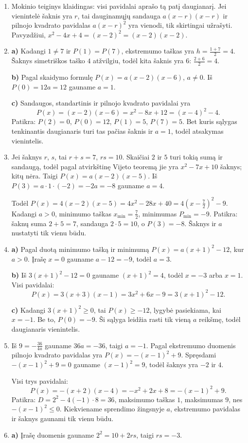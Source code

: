 \documentclass[12pt,a4paper]{article}
\begin{document}
\begin{enumerate}
\textbf{c)} Šaknis $2$ yra dviguboji. $R(x)=2(x-2)^2=2x^2-8x+8$. Minimumo taškas $2$, minimumas $0$; pilnojo kvadrato pavidalas sutampa su sandaugos pavidalu.
\item Mokinio teiginys klaidingas: visi pavidalai aprašo tą patį daugianarį. Jei vienintelė šaknis yra $r$, tai dauginamųjų sandauga $a(x-r)(x-r)$ ir pilnojo kvadrato pavidalas $a(x-r)^2$ yra vienodi, tik skirtingai užrašyti. Pavyzdžiui, $x^2-4x+4=(x-2)^2=(x-2)(x-2)$.
\item \textbf{a)} Kadangi $1\ne7$ ir $P(1)=P(7)$, ekstremumo taškas yra $h=\frac{1+7}{2}=4$. Šaknys simetriškos taško $4$ atžvilgiu, todėl kita šaknis yra $6$: $\frac{2+6}{2}=4$.

\textbf{b)} Pagal skaidymo formulę $P(x)=a(x-2)(x-6)$, $a\ne0$. Iš $P(0)=12a=12$ gauname $a=1$.

\textbf{c)} Sandaugos, standartinis ir pilnojo kvadrato pavidalai yra
\[P(x)=(x-2)(x-6)=x^2-8x+12=(x-4)^2-4.\]
Patikra: $P(2)=0$, $P(0)=12$, $P(1)=5$, $P(7)=5$. Bet kuris sąlygas tenkinantis daugianaris turi tas pačias šaknis ir $a=1$, todėl atsakymas vienintelis.
\item Jei šaknys $r$, $s$, tai $r+s=7$, $rs=10$. Skaičiai $2$ ir $5$ turi tokią sumą ir sandaugą, todėl pagal atvirkštinę Vijeto teoremą jie yra $x^2-7x+10$ šaknys; kitų nėra. Taigi $P(x)=a(x-2)(x-5)$. Iš $P(3)=a\cdot1\cdot(-2)=-2a=-8$ gauname $a=4$.

Todėl $P(x)=4(x-2)(x-5)=4x^2-28x+40=4\left(x-\frac{7}{2}\right)^2-9$. Kadangi $a>0$, minimumo taškas $x_{\min}=\frac{7}{2}$, minimumas $P_{\min}=-9$. Patikra: šaknų suma $2+5=7$, sandauga $2\cdot5=10$, o $P(3)=-8$. Šaknys ir $a$ nustatyti tik vienu būdu.
\item \textbf{a)} Pagal duotą minimumo tašką ir minimumą $P(x)=a(x+1)^2-12$, kur $a>0$. Įrašę $x=0$ gauname $a-12=-9$, todėl $a=3$.

\textbf{b)} Iš $3(x+1)^2-12=0$ gauname $(x+1)^2=4$, todėl $x=-3$ arba $x=1$. Visi pavidalai:
\[P(x)=3(x+3)(x-1)=3x^2+6x-9=3(x+1)^2-12.\]

\textbf{c)} Kadangi $3(x+1)^2\ge0$, tai $P(x)\ge-12$, lygybė pasiekiama, kai $x=-1$. Be to, $P(0)=-9$. Ši sąlyga leidžia rasti tik vieną $a$ reikšmę, todėl daugianaris vienintelis.
\item Iš $9=-\frac{36}{4a}$ gauname $36a=-36$, taigi $a=-1$. Pagal ekstremumo duomenis pilnojo kvadrato pavidalas yra $P(x)=-(x-1)^2+9$. Spręsdami $-(x-1)^2+9=0$ gauname $(x-1)^2=9$, todėl šaknys yra $-2$ ir $4$.

Visi trys pavidalai:
\[P(x)=-(x+2)(x-4)=-x^2+2x+8=-(x-1)^2+9.\]
Patikra: $D=2^2-4(-1)\cdot8=36$, maksimumo taškas $1$, maksimumas $9$, nes $-(x-1)^2\leq0$. Kiekviename sprendimo žingsnyje $a$, ekstremumo pavidalas ir šaknys gaunami tik vienu būdu.
\item \textbf{a)} Įrašę duomenis gauname $2^2=10+2rs$, taigi $rs=-3$.


\end{enumerate}
\end{document}
